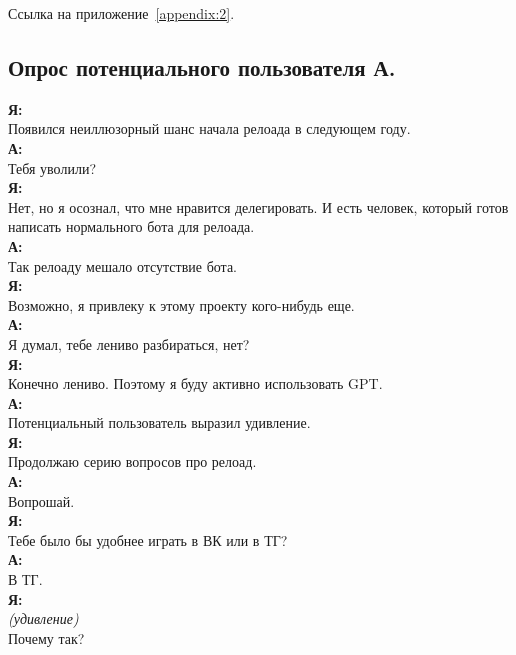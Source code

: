 Ссылка на приложение~\ref{appendix:2}.\\
\subsection{Опрос потенциального пользователя А.}
\textbf{Я:}\\
Появился неиллюзорный шанс начала релоада в следующем году. \\

\textbf{А:}
\\Тебя уволили? \\

\textbf{Я:}
\\Нет, но я осознал, что мне нравится делегировать. И есть человек, который готов написать нормального бота для релоада. \\

\textbf{А:}\\
Так релоаду мешало отсутствие бота. \\

\textbf{Я:}\\
Возможно, я привлеку к этому проекту кого-нибудь еще. \\

\textbf{А:}\\
Я думал, тебе лениво разбираться, нет? \\

\textbf{Я:}\\
Конечно лениво. Поэтому я буду активно использовать GPT. \\

\textbf{А:}\\
Потенциальный пользователь выразил удивление. \\

\textbf{Я:}\\
Продолжаю серию вопросов про релоад. \\

\textbf{А:}\\
Вопрошай. \\

\textbf{Я:}\\
Тебе было бы удобнее играть в ВК или в ТГ? \\

\textbf{А:}\\
В ТГ. \\

\textbf{Я:}\\
\textit{(удивление)} \\
Почему так? \\

